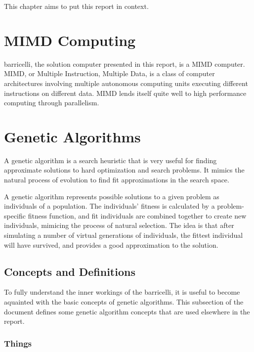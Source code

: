 This chapter aims to put this report in context.

\section{MIMD Computing}

\Gls{barricelli}, the solution computer presented in this report, is a \Gls{MIMD} computer. \Gls{MIMD}, or Multiple Instruction, Multiple Data, is a class of computer architectures involving multiple autonomous computing units executing different instructions on different data.
MIMD lends itself quite well to high performance computing through parallelism.



\section{Genetic Algorithms}

A genetic algorithm is a search heuristic that is very useful for finding approximate solutions to hard optimization and search problems.
It mimics the natural process of evolution to find fit approximations in the search space.

A genetic algorithm represents possible solutions to a given problem as individuals of a population.
The individuals' fitness is calculated by a problem-specific fitness function, and fit individuals are combined together to create new individuals, mimicing the process of natural selection.
The idea is that after simulating a number of virtual generations of individuals, the fittest individual will have survived, and provides a good approximation to the solution.

\subsection{Concepts and Definitions}

To fully understand the inner workings of the \Gls{barricelli}, it is useful to become aquainted with the basic concepts of genetic algorithms.
This subsection of the document defines some genetic algorithm concepts that are used elsewhere in the report.

\subsubsection{Things}

